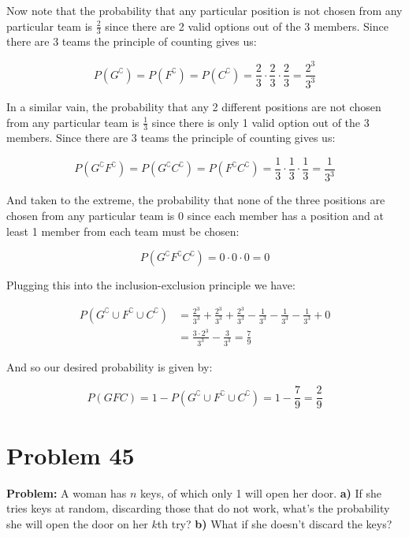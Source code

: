 \documentclass{article}
\begin{document}
Now note that the probability that any particular position is not chosen from any particular team is $\frac{2}{3}$ since there are 2 valid options out of the 3 members. Since there are 3 teams the principle of counting gives us:

\begin{equation*}
    P(G^\complement)=P(F^\complement)=P(C^\complement)=\frac{2}{3}\cdot\frac{2}{3}\cdot\frac{2}{3}=\frac{2^3}{3^3}
\end{equation*}

In a similar vain, the probability that any 2 different positions are not chosen from any particular team is $\frac{1}{3}$ since there is only 1 valid option out of the 3 members. Since there are 3 teams the principle of counting gives us:

\begin{equation*}
    P(G^\complement F^\complement)=P(G^\complement C^\complement)=P(F^\complement C^\complement)=\frac{1}{3}\cdot\frac{1}{3}\cdot\frac{1}{3}=\frac{1}{3^3}
\end{equation*}

And taken to the extreme, the probability that none of the three positions are chosen from any particular team is 0 since each member has a position and at least 1 member from each team must be chosen:

\begin{equation*}
    P(G^\complement F^\complement C^\complement)=0\cdot0\cdot0=0
\end{equation*}

Plugging this into the inclusion-exclusion principle we have:

\begin{align*}
    P(G^\complement\cup F^\complement\cup C^\complement)&=\frac{2^3}{3^3}+\frac{2^3}{3^3}+\frac{2^3}{3^3}-\frac{1}{3^3}-\frac{1}{3^3}-\frac{1}{3^3}+0\\
    &=\frac{3\cdot2^3}{3^3}-\frac{3}{3^3}=\frac{7}{9}
\end{align*}

And so our desired probability is given by:

\begin{equation*}
    P(GFC)=1-P(G^\complement\cup F^\complement\cup C^\complement)=1-\frac{7}{9}=\frac{2}{9}
\end{equation*}

\section*{Problem 45}
\noindent\textbf{Problem:} A woman has $n$ keys, of which only 1 will open her door. \textbf{a)} If she tries keys at random, discarding those that do not work, what's the probability she will open the door on her $k$th try? \textbf{b)} What if she doesn't discard the keys?
\bigskip
\end{document}
